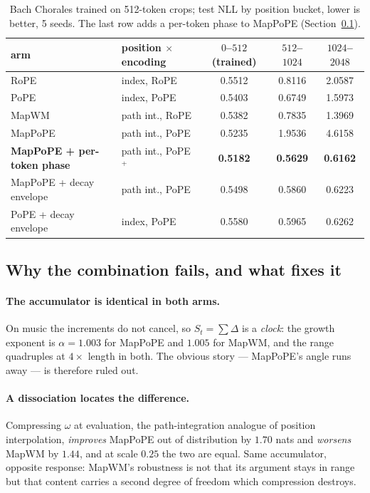 \documentclass[10pt]{article}
\begin{document}
\begin{table}[h]\centering\footnotesize
\caption{Bach Chorales trained on 512-token crops; test NLL by position bucket, lower is better, 5 seeds.
The last row adds a per-token phase to MapPoPE (Section~\ref{sec:pope-mech}).}
\begin{tabular}{llccc}
\toprule
arm & position $\times$ encoding & $0$--$512$ (trained) & $512$--$1024$ & $1024$--$2048$ \\
\midrule
RoPE & index, RoPE & 0.5512 & 0.8116 & 2.0587 \\
PoPE & index, PoPE & 0.5403 & 0.6749 & 1.5973 \\
MapWM & path int., RoPE & 0.5382 & 0.7835 & 1.3969 \\
MapPoPE & path int., PoPE & 0.5235 & 1.9536 & 4.6158 \\
\textbf{MapPoPE + per-token phase} & path int., PoPE${}^{+}$ & \textbf{0.5182} & \textbf{0.5629} & \textbf{0.6162} \\
MapPoPE + decay envelope & path int., PoPE & 0.5498 & 0.5860 & 0.6223 \\
PoPE + decay envelope & index, PoPE & 0.5580 & 0.5965 & 0.6262 \\
\bottomrule
\end{tabular}
\label{tab:jsb-len}
\end{table}

\subsection{Why the combination fails, and what fixes it}
\label{sec:pope-mech}

\paragraph{The accumulator is identical in both arms.} On music the increments do not cancel, so
$S_t=\sum\Delta$ is a \emph{clock}: the growth exponent is $\alpha=1.003$ for MapPoPE and $1.005$ for MapWM,
and the range quadruples at $4\times$ length in both. The obvious story --- MapPoPE's angle runs away --- is
therefore ruled out. %

\paragraph{A dissociation locates the difference.} Compressing $\omega$ at evaluation, the path-integration
analogue of position interpolation, \emph{improves} MapPoPE out of distribution by $1.70$ nats and
\emph{worsens} MapWM by $1.44$, and at scale $0.25$ the two are equal. Same accumulator, opposite response:
MapWM's robustness is not that its argument stays in range but that content carries a second degree of
freedom which compression destroys. %
\end{document}
